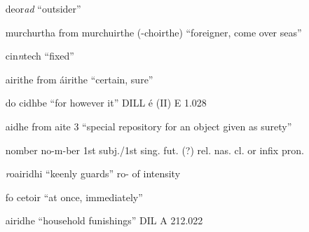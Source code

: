 \documentclass[11pt]{article}
\begin{document}
\begin{enumerate}
  \item[deor\emph{ad}] \enquote{outsider} 
  \item[murchurtha] from murchuirthe (-choirthe) \enquote{foreigner, come over seas} 
  \item[cin\emph{n}tech] \enquote{fixed}
  \item[airithe] from \'{a}irithe \enquote{certain, sure}
  \item[do cidhbe] \enquote{for however it} DILL \'{e} (II) E 1.028
  \item[aidhe] from aite 3 \enquote{special repository for an object given as surety}
  \item[nomber] no-m-ber 1st subj./1st sing. fut. (?) rel. nas. cl. or infix pron.
  \item[\emph{r}oairidhi] \enquote{keenly guards} ro- of intensity
  \item[fo cetoir] \enquote{at once, immediately} 
  \item[airidhe] \enquote{household funishings} DIL A 212.022
\end{enumerate}
\end{document}
